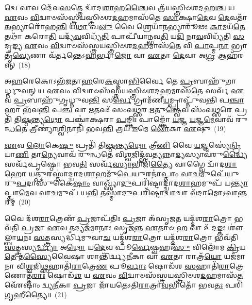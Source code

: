 𑌦𑍍𑌵𑍇 𑌵𑌾𑌵 𑌦𑍇᳴𑌵\-\ul{𑌸}\-𑌤𑍍𑌤𑍍𑌰𑍇 𑌦𑍍𑌵𑌾᳴𑌦\-\ul{𑌶𑌾}\-𑌹\-\ul{𑌶𑍍𑌚𑍈}\-𑌵 𑌤𑍍𑌰᳴𑌯𑌸𑍍𑌤𑍍𑌰𑌿𑍞𑌶\-\ul{𑌦}\-𑌹\-\ul{𑌶𑍍𑌚} 𑌯 \ul{𑌏}\-𑌵𑌂 \ul{𑌵𑌿}\-𑌦𑍍𑌵𑌾𑍞𑌸᳴𑌸𑍍𑌤𑍍𑌰𑌯𑌸𑍍𑌤𑍍𑌰𑌿𑍞𑌶\-\ul{𑌦}\-𑌹𑌮𑌾𑌸᳴𑌤𑍇 \ul{𑌸𑌾}\-𑌕𑍍𑌷𑌾\-\ul{𑌦𑍇}\-𑌵 \ul{𑌦𑍇}\-𑌵𑌤𑌾᳴ \ul{𑌅}\-𑌭𑍍𑌯𑌾𑌰𑍋᳴𑌹\-\ul{𑌨𑍍𑌤𑌿} 𑌯\-\ul{𑌥𑌾} 𑌖\-\ul{𑌲𑍁} 𑌵𑍈 𑌶𑍍𑌰𑍇𑌯𑌾᳴\-\ul{𑌨}\-𑌭𑍍𑌯𑌾𑌰𑍂᳴𑌢𑌃 \ul{𑌕𑌾}\-𑌮𑌯᳴\-\ul{𑌤𑍇} 𑌤𑌥𑌾᳴ 𑌕𑌰𑍋\-\ul{𑌤𑌿} 𑌯𑌦𑍍𑌯᳴\-\ul{𑌵}\-𑌵𑌿𑌧𑍍𑌯᳴\-\ul{𑌤𑌿} 𑌪𑌾𑌪𑍀᳴𑌯𑌾𑌨𑍍𑌭𑌵\-\ul{𑌤𑌿} 𑌯\-\ul{𑌦𑌿} 𑌨𑌾\-\ul{𑌵}\-𑌵𑌿𑌧𑍍𑌯᳴𑌤𑌿 \ul{𑌸}\-𑌦𑍃𑌙𑍍𑌯 \ul{𑌏}\-𑌵𑌂 \ul{𑌵𑌿}\-𑌦𑍍𑌵𑌾𑍞𑌸᳴𑌸𑍍𑌤𑍍𑌰𑌯𑌸𑍍𑌤𑍍𑌰𑌿𑍞𑌶\-\ul{𑌦}\-𑌹𑌮𑌾𑌸᳴\-\ul{𑌤𑍇} 𑌵𑌿 \ul{𑌪𑌾}\-𑌪𑍍𑌮\-\ul{𑌨𑌾} 𑌭𑍍𑌰𑌾𑌤𑍃᳴\-\ul{𑌵𑍍𑌯𑍇}\-𑌣𑌾 𑌵᳴𑌰𑍍𑌤𑌨𑍍𑌤𑍇\-𑌽\-\ul{𑌹}\-𑌰𑍍𑌭𑌾\-\ul{𑌜𑍋} 𑌵𑌾 \ul{𑌏}\-𑌤𑌾 \ul{𑌦𑍇}\-𑌵𑌾 𑌅\-\ul{𑌗𑍍𑌰} 𑌆𑌹᳴𑌰𑌨𑍍𑌨𑍍~(18)

𑌅\-\ul{𑌹}\-𑌰𑍇𑌕𑍋\-𑌽𑌭᳴\-\ul{𑌜}\-𑌤𑌾\-\ul{𑌹}\-𑌰𑍇\-\ul{𑌕}\-𑌸𑍍𑌤𑌾\-\ul{𑌭𑌿}\-𑌰𑍍𑌵𑍈 𑌤𑍇 \ul{𑌪𑍍𑌰}\-𑌬𑌾𑌹𑍁᳴𑌗𑌾𑌰𑍍𑌧𑍍𑌨𑍁\-\ul{𑌵}\-𑌨𑍍 𑌯 \ul{𑌏}\-𑌵𑌂 \ul{𑌵𑌿}\-𑌦𑍍𑌵𑌾𑍞𑌸᳴𑌸𑍍𑌤𑍍𑌰𑌯𑌸𑍍𑌤𑍍𑌰𑌿𑍞𑌶\-\ul{𑌦}\-𑌹𑌮𑌾𑌸᳴\-\ul{𑌤𑍇} 𑌸𑌰𑍍𑌵᳴ \ul{𑌏}\-𑌵 \ul{𑌪𑍍𑌰}\-𑌬𑌾𑌹𑍁᳴𑌗𑍃𑌧𑍍𑌨𑍁𑌵\-\ul{𑌨𑍍𑌤𑌿} 𑌸\-\ul{𑌰𑍍𑌵𑍇} 𑌗𑍍𑌰𑌾𑌮᳴𑌣𑍀\-\ul{𑌯}\-𑌮𑍍𑌪𑍍𑌰𑌾𑌪𑍍𑌨𑍁᳴𑌵𑌨𑍍𑌤𑌿 𑌪\-\ul{𑌞𑍍𑌚𑌾}\-𑌹𑌾 𑌭᳴𑌵\-\ul{𑌨𑍍𑌤𑌿} 𑌪\-\ul{𑌞𑍍𑌚} 𑌵𑌾 \ul{𑌋}\-𑌤𑌵𑌃᳴ 𑌸𑌂𑌵\-\ul{𑌥𑍍𑌸}\-𑌰 \ul{𑌋}\-𑌤𑍁\-\ul{𑌷𑍍𑌵𑍇}\-𑌵 𑌸𑌂᳴𑌵\-\ul{𑌥𑍍𑌸}\-𑌰𑍇 𑌪𑍍𑌰𑌤𑌿᳴ 𑌤𑌿\-\ul{𑌷𑍍𑌠}\-𑌨𑍍𑌤𑍍𑌯\-\ul{𑌥𑍋} 𑌪𑌞𑍍𑌚𑌾॑𑌕𑍍𑌷𑌰𑌾 \ul{𑌪}\-𑌙𑍍𑌕𑍍𑌤𑌿𑌃 𑌪𑌾𑌙𑍍𑌕𑍍𑌤𑍋᳴ \ul{𑌯}\-𑌜𑍍𑌞 \ul{𑌯}\-𑌜𑍍𑌞\-\ul{𑌮𑍇}\-𑌵𑌾𑌵᳴ 𑌰𑍁𑌨𑍍𑌧\-\ul{𑌤𑍇} 𑌤𑍍𑌰𑍀𑌣𑍍𑌯𑌾॑\-\ul{𑌶𑍍𑌵𑌿}\-𑌨𑌾𑌨𑌿᳴ 𑌭𑌵\-\ul{𑌨𑍍𑌤𑌿} 𑌤𑍍𑌰𑌯᳴ \ul{𑌇}\-𑌮𑍇 \ul{𑌲𑍋}\-𑌕𑌾 \ul{𑌏}\-𑌷𑍁~(19)

\-\ul{𑌏}\-𑌵 \ul{𑌲𑍋}\-𑌕𑍇\-\ul{𑌷𑍁} 𑌪𑍍𑌰𑌤𑌿᳴ 𑌤𑌿\-\ul{𑌷𑍍𑌠}\-𑌨𑍍𑌤𑍍𑌯\-\ul{𑌥𑍋} 𑌤𑍍𑌰𑍀\-\ul{𑌣𑌿} 𑌵𑍈 \ul{𑌯}\-𑌜𑍍𑌞𑌸𑍍𑌯𑍇॑\-\ul{𑌨𑍍𑌦𑍍𑌰𑌿}\-𑌯𑌾\-\ul{𑌣𑌿} 𑌤𑌾\-\ul{𑌨𑍍𑌯𑍇}\-𑌵𑌾𑌵᳴ 𑌰𑍁𑌨𑍍𑌧𑌤𑍇 𑌵𑌿\-\ul{𑌶𑍍𑌵}\-𑌜𑌿𑌦𑍍𑌭᳴𑌵\-\ul{𑌤𑍍𑌯}\-𑌨𑍍𑌨𑌾\-\ul{𑌦𑍍𑌯}\-𑌸𑍍𑌯𑌾𑌵᳴𑌰𑍁\-\ul{𑌦𑍍𑌧𑍍𑌯𑍈} 𑌸𑌰𑍍𑌵᳴𑌪𑍃𑌷𑍍𑌠𑍋 𑌭𑌵\-\ul{𑌤𑌿} 𑌸𑌰𑍍𑌵᳴\-\ul{𑌸𑍍𑌯𑌾}\-𑌭𑌿𑌜𑌿᳴\-\ul{𑌤𑍍𑌯𑍈} 𑌵𑌾𑌗𑍍𑌵𑍈 𑌦𑍍𑌵𑌾᳴𑌦\-\ul{𑌶𑌾}\-𑌹𑍋 𑌯\-\ul{𑌤𑍍𑌪𑍁}\-𑌰𑌸𑍍𑌤𑌾॑𑌦𑍍𑌦𑍍𑌵𑌾𑌦\-\ul{𑌶𑌾}\-𑌹𑌮𑍁᳴\-\ul{𑌪𑍇}\-𑌯𑍁𑌰𑌨𑌾॑\-\ul{𑌪𑍍𑌤𑌾𑌂} 𑌵𑌾\-\ul{𑌚}\-𑌮𑍁𑌪𑍇᳴𑌯𑍁𑌰𑍁\-\ul{𑌪}\-𑌦𑌾𑌸𑍁᳴𑌕𑍈\-\ul{𑌷𑌾𑌂} 𑌵𑌾𑌖𑍍𑌸𑍍𑌯𑌾᳴\-\ul{𑌦𑍁}\-𑌪𑌰𑌿᳴𑌷𑍍𑌟𑌾𑌦𑍍𑌦𑍍𑌵𑌾𑌦\-\ul{𑌶𑌾}\-𑌹𑌮𑍁𑌪᳴ 𑌯\-\ul{𑌨𑍍𑌤𑍍𑌯𑌾}\-𑌪𑍍𑌤𑌾\-\ul{𑌮𑍇}\-𑌵 𑌵𑌾\-\ul{𑌚}\-𑌮𑍁𑌪᳴ 𑌯\-\ul{𑌨𑍍𑌤𑌿} 𑌤𑌸𑍍𑌮𑌾᳴\-\ul{𑌦𑍁}\-𑌪𑌰𑌿᳴𑌷𑍍𑌟𑌾\-\ul{𑌦𑍍𑌵𑌾}\-𑌚𑌾 𑌵᳴𑌦𑌾𑌮𑍋\-𑌽𑌵𑌾\-\ul{𑌨𑍍𑌤}\-𑌰𑌮𑍍~(20)

𑌵𑍈 𑌦᳴𑌶\-\ul{𑌰𑌾}\-𑌤𑍍𑌰𑍇𑌣᳴ \ul{𑌪𑍍𑌰}\-𑌜𑌾𑌪᳴𑌤𑌿𑌃 \ul{𑌪𑍍𑌰}\-𑌜𑌾 𑌅᳴𑌸𑍃𑌜\-\ul{𑌤} 𑌯𑌦𑍍𑌦᳴𑌶\-\ul{𑌰𑌾}\-𑌤𑍍𑌰𑍋 𑌭𑌵᳴𑌤𑌿 \ul{𑌪𑍍𑌰}\-𑌜𑌾 \ul{𑌏}\-𑌵 𑌤𑌦𑍍𑌯𑌜᳴𑌮𑌾𑌨𑌾𑌃 𑌸𑍃𑌜𑌨𑍍𑌤 \ul{𑌏}\-𑌤𑌾𑍞 \ul{𑌹} 𑌵𑌾 𑌉᳴\-\ul{𑌦}\-𑌙𑍍𑌕𑌃 𑌶𑍗॑𑌲𑍍𑌬𑌾\-\ul{𑌯}\-𑌨𑌃 \ul{𑌸}\-𑌤𑍍𑌤𑍍𑌰𑌸𑍍𑌯𑌰𑍍𑌦𑍍𑌧𑌿᳴𑌮𑍁𑌵𑌾\-\ul{𑌚} 𑌯𑌦𑍍𑌦᳴𑌶\-\ul{𑌰𑌾}\-𑌤𑍍𑌰𑍋 𑌯𑌦𑍍𑌦᳴𑌶\-\ul{𑌰𑌾}\-𑌤𑍍𑌰𑍋 𑌭𑌵᳴𑌤𑌿 \ul{𑌸}\-𑌤𑍍𑌤𑍍𑌰𑌸𑍍𑌯\-\ul{𑌰𑍍𑌦𑍍𑌧𑍍𑌯𑌾} 𑌅\-\ul{𑌥𑍋} 𑌯\-\ul{𑌦𑍇}\-𑌵 𑌪𑍂\-\ul{𑌰𑍍𑌵𑍇}\-𑌷𑍍𑌵𑌹𑌃᳴\-\ul{𑌸𑍁} 𑌵𑌿𑌲𑍋᳴𑌮 \ul{𑌕𑍍𑌰𑌿}\-𑌯\-\ul{𑌤𑍇} 𑌤\-\ul{𑌸𑍍𑌯𑍈}\-𑌵𑍈𑌷𑌾 𑌶𑌾𑌨𑍍𑌤𑌿᳴𑌰𑍍𑌦𑍍𑌵𑍍𑌯\-\ul{𑌨𑍀}\-𑌕𑌾 𑌵𑌾 \ul{𑌏}\-𑌤𑌾 𑌰𑌾𑌤𑍍𑌰᳴\-\ul{𑌯𑍋} 𑌯𑌜᳴𑌮𑌾𑌨𑌾 𑌵𑌿\-\ul{𑌶𑍍𑌵}\-𑌜𑌿\-\ul{𑌥𑍍𑌸}\-𑌹𑌾𑌤𑌿᳴\-\ul{𑌰𑌾}\-𑌤𑍍𑌰𑍇\-\ul{𑌣} 𑌪𑍂\-\ul{𑌰𑍍𑌵𑌾𑌃} 𑌷𑍋𑌡᳴𑌶 \ul{𑌸}\-𑌹𑌾𑌤𑌿᳴\-\ul{𑌰𑌾}\-𑌤𑍍𑌰𑍇𑌣𑍋𑌤𑍍𑌤᳴\-\ul{𑌰𑌾𑌃} 𑌷𑍋𑌡᳴\-\ul{𑌶} 𑌯 \ul{𑌏}\-𑌵𑌂 \ul{𑌵𑌿}\-𑌦𑍍𑌵𑌾𑍞𑌸᳴𑌸𑍍𑌤𑍍𑌰𑌯𑌸𑍍𑌤𑍍𑌰𑌿𑍞𑌶\-\ul{𑌦}\-𑌹𑌮𑌾𑌸᳴\-\ul{𑌤} 𑌐᳴𑌷𑌾𑌂॑ 𑌦𑍍𑌵𑍍𑌯\-\ul{𑌨𑍀}\-𑌕𑌾 \ul{𑌪𑍍𑌰}\-𑌜𑌾 𑌜𑌾᳴𑌯𑌤𑍇\-𑌽𑌤𑌿\-\ul{𑌰𑌾}\-𑌤𑍍𑌰𑌾\-\ul{𑌵}\-𑌭𑌿𑌤𑍋᳴ 𑌭𑌵\-\ul{𑌤𑌃} 𑌪𑌰𑌿᳴𑌗𑍃𑌹𑍀𑌤𑍍𑌯𑍈॥~(21)

